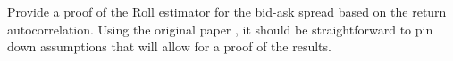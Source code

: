 Provide a proof of the Roll estimator for the bid-ask spread based on the return autocorrelation. Using the original paper \citep{roll1984simple}, it should be straightforward to pin down assumptions that will allow for a proof of the results.